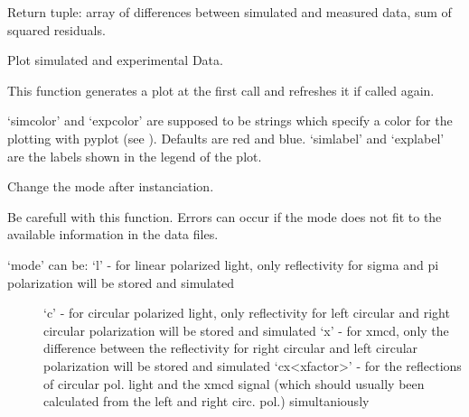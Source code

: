 \documentclass[letterpaper,10pt,english]{sphinxmanual}
\begin{document}
\begin{fulllineitems}
\begin{fulllineitems}
\end{fulllineitems}


\begin{fulllineitems}
\label{\detokenize{modules-api/experiment:Experiment.ReflDataSimulator.getResidualsSSR}}
Return tuple: array of differences between simulated and measured data, sum of squared residuals.

\end{fulllineitems}


\begin{fulllineitems}
\label{\detokenize{modules-api/experiment:Experiment.ReflDataSimulator.plotData}}
Plot simulated and experimental Data.

This function generates a plot at the first call and refreshes it if called again.

‘simcolor’ and ‘expcolor’ are supposed to be strings which specify a color for the plotting with pyplot (see ).
Defaults are red and blue.
‘simlabel’ and ‘explabel’ are the labels shown in the legend of the plot.

\end{fulllineitems}


\begin{fulllineitems}
\label{\detokenize{modules-api/experiment:Experiment.ReflDataSimulator.setMode}}
Change the mode after instanciation.

Be carefull with this function. Errors can occur if the mode does not fit to the available information in the data files.
\begin{description}
\item[{‘mode’ can be:    ‘l’             - for linear polarized light, only reflectivity for sigma and pi polarization will be stored and simulated}] \leavevmode
‘c’             - for circular polarized light, only reflectivity for left circular and right circular polarization will be stored and simulated
‘x’             - for xmcd, only the difference between the reflectivity for right circular and left circular polarization will be stored and simulated
‘cx\textless{}xfactor\textgreater{}’   - for the reflections of circular pol. light and the xmcd signal (which should usually been calculated from the left and right circ. pol.) simultaniously
\begin{quote}


\end{quote}
\end{description}
\end{fulllineitems}
\end{fulllineitems}
\end{document}
